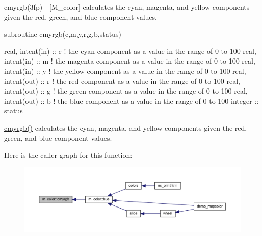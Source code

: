 \begin{DoxyDescription}
\item[\label{_CMYRGB}%
N\+A\+ME ]cmyrgb(3fp) -\/ \mbox{[}M\+\_\+color\mbox{]} calculates the cyan, magenta, and yellow components given the red, green, and blue component values. 


\item[S\+Y\+N\+O\+P\+S\+IS ]
\begin{DoxyPre}
    subroutine cmyrgb(c,m,y,r,g,b,status)\end{DoxyPre}



\begin{DoxyPre}     real, intent(in)  :: c ! the cyan component as a value in the range of 0 to 100
     real, intent(in)  :: m ! the magenta component as a value in the range of 0 to 100
     real, intent(in)  :: y ! the yellow component as a value in the range of 0 to 100
     real, intent(out) :: r ! the red component as a value in the range of 0 to 100
     real, intent(out) :: g ! the green component as a value in the range of 0 to 100
     real, intent(out) :: b ! the blue component as a value in the range of 0 to 100
     integer           :: status
    \end{DoxyPre}
 


\item[D\+E\+S\+C\+R\+I\+P\+T\+I\+ON ]\hyperlink{namespacem__color_ab91687e87d0901874e52efe5933e3044}{cmyrgb()} calculates the cyan, magenta, and yellow components given the red, green, and blue component values.


\end{DoxyDescription}Here is the caller graph for this function\+:
\nopagebreak
\begin{figure}[H]
\begin{center}
\leavevmode
\includegraphics[width=350pt]{namespacem__color_ab91687e87d0901874e52efe5933e3044_icgraph}
\end{center}
\end{figure}
\mbox{\label{namespacem__color_a84a36043d278bc56a7148483a862dec8}} 
